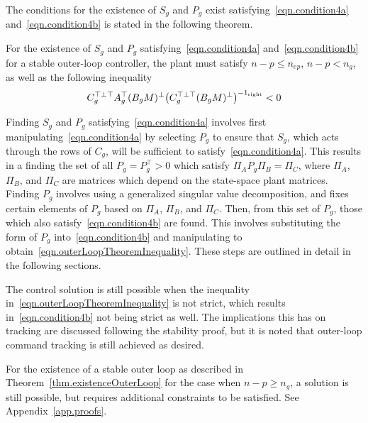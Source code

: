 The conditions for the existence of $S_{g}$ and $P_{g}$ exist satisfying\ \eqref{eqn.condition4a} and\ \eqref{eqn.condition4b} is stated in the following theorem.

\begin{thm-dan}\label{thm.existenceOuterLoop}
  For the existence of $S_{g}$ and $P_{g}$ satisfying\ \eqref{eqn.condition4a} and\ \eqref{eqn.condition4b} for a stable outer-loop controller, the plant must satisfy $n-p\leq n_{ep}$, $n-p<n_{g}$, as well as the following inequality
  \begin{equation}
    \label{eqn.outerLoopTheoremInequality}
    C_{g}^{\top\perp\top}A_{g}^{\top}(B_{g}M)^{\perp}\bigr(C_{g}^{\top\perp\top}(B_{g}M)^{\perp}\bigr)^{-1_{\textnormal{right}}}
    <0
  \end{equation}
\end{thm-dan}

\begin{proof-dan}
  Finding $S_{g}$ and $P_{g}$ satisfying\ \eqref{eqn.condition4a} involves first manipulating\ \eqref{eqn.condition4a} by selecting $P_{g}$ to ensure that $S_{g}$, which acts through the rows of $C_{g}$, will be sufficient to satisfy\ \eqref{eqn.condition4a}.
  This results in a finding the set of all $P_{g}=P_{g}^{\top}>0$ which satisfy $\Pi_{A}P_{g}\Pi_{B}=\Pi_{C}$, where $\Pi_{A}$, $\Pi_{B}$, and $\Pi_{C}$ are matrices which depend on the state-space plant matrices.
  Finding $P_{g}$ involves using a generalized singular value decomposition, and fixes certain elements of $P_{g}$ based on $\Pi_{A}$, $\Pi_{B}$, and $\Pi_{C}$.
  Then, from this set of $P_{g}$, those which also satisfy\ \eqref{eqn.condition4b} are found.
  This involves substituting the form of $P_{g}$ into\ \eqref{eqn.condition4b} and manipulating to obtain\ \eqref{eqn.outerLoopTheoremInequality}.
  These steps are outlined in detail in the following sections.
\end{proof-dan}

\begin{rem-dan}
  The control solution is still possible when the inequality in\ \eqref{eqn.outerLoopTheoremInequality} is not strict, which results in\ \eqref{eqn.condition4b} not being strict as well.
  The implications this has on tracking are discussed following the stability proof, but it is noted that outer-loop command tracking is still achieved as desired.
\end{rem-dan}

\begin{rem-dan}
  For the existence of a stable outer loop as described in Theorem~\ref{thm.existenceOuterLoop} for the case when $n-p\geq n_{g}$, a solution is still possible, but requires additional constraints to be satisfied.
  See Appendix~\ref{app.proofs}.
\end{rem-dan}

